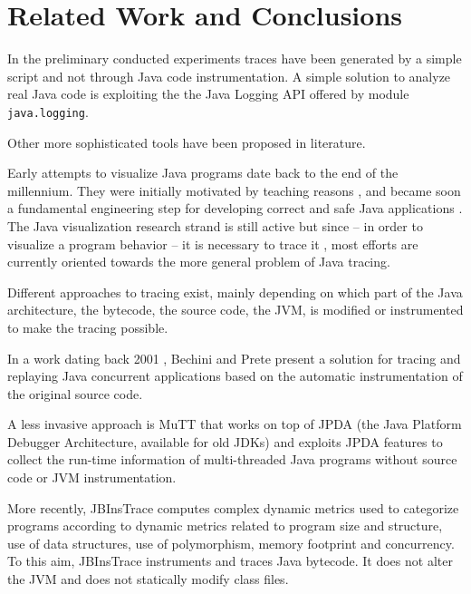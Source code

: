 \section{Related Work and Conclusions}
\label{sec:rel-concl}

In the preliminary conducted experiments traces have been generated by a simple script and not through Java code instrumentation.
A simple solution to analyze real Java code is exploiting the the Java Logging API offered by module \lstinline{java.logging}.

Other more sophisticated tools have been proposed in literature. %

Early attempts to visualize Java programs date back to the end of the millennium. They were initially motivated by teaching reasons \cite{dershem1999java}, and became soon a fundamental engineering step for developing correct and safe Java applications \cite{DBLP:conf/wcre/Systa00,DBLP:conf/dagstuhl/PauwJMSVY01}. The Java visualization research strand is still active \cite{DBLP:journals/spe/JayaramanJL17,DBLP:journals/spe/PJJS21} but since -- in order to visualize a program behavior -- it is necessary to trace it \cite{DBLP:conf/dagstuhl/Mehner01}, most efforts are currently oriented towards the more general problem of Java tracing.

Different approaches to tracing exist, mainly depending on which part of the Java architecture, the bytecode, the source code, the JVM, is modified or instrumented to make the tracing possible.

In a work dating back 2001 \cite{DBLP:journals/fgcs/BechiniP01}, Bechini and Prete present a solution for tracing and replaying Java concurrent applications based on the automatic instrumentation of the original source code.

A less invasive approach is MuTT \cite{DBLP:conf/ACISicis/LiuX09} that works on top of JPDA (the Java Platform Debugger Architecture, available for old JDKs) and exploits JPDA features to collect the run-time information of multi-threaded Java programs without source code or JVM instrumentation.

More recently, JBInsTrace \cite{DBLP:journals/scp/CasertaZ14} computes complex dynamic metrics used to categorize programs according to dynamic metrics related to program size and structure, use of data structures, use of
polymorphism, memory footprint and concurrency. 
To this aim, JBInsTrace instruments and traces Java bytecode. It does not alter the JVM and does not statically modify class files. 

